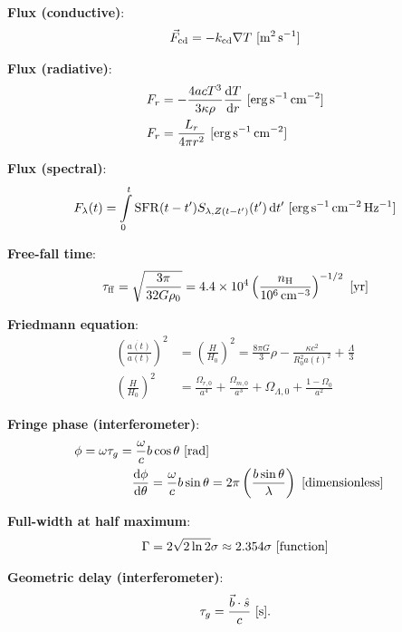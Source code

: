 \documentclass[a4paper,10pt]{article}
\begin{document}
{\noindent}\textbf{Flux (conductive)}:
\begin{align*}
    \vec{F}_{\rm cd} = -k_{\rm cd}\nabla T ~ [{\rm m^2\,s^{-1}}]
\end{align*}

{\noindent}\textbf{Flux (radiative)}:
\begin{align*}
    F_r &= -\frac{4acT^3}{3\kappa\rho}\frac{{\rm d}T}{{\rm d}r} ~ [{\rm erg\,s^{-1}\,cm^{-2}}] \\
    F_r &=  \frac{L_r}{4\pi r^2} ~ [{\rm erg\,s^{-1}\,cm^{-2}}]
\end{align*}

{\noindent}\textbf{Flux (spectral)}:
\begin{align*}
    F_\lambda(t) = \int\limits_0^t \mathrm{SFR}(t-t')S_{\lambda,Z(t-t')}(t')\,\mathrm{d}t' ~ [{\rm erg\,s^{-1}\,cm^{-2}\,Hz^{-1}}]
\end{align*}

{\noindent}\textbf{Free-fall time}:
\begin{align*}
    \tau_{\rm ff} = \sqrt{\frac{3\pi}{32G\rho_0}} = 4.4\times10^4 \left(\frac{n_{\rm H}}{10^6\,{\rm cm^{-3}}}\right)^{-1/2} ~ [{\rm yr}]
\end{align*}

{\noindent}\textbf{Friedmann equation}:
\begin{align*}
    \left(\frac{\dot{a(t)}}{a(t)}\right)^2 &=  \left(\frac{H}{H_0}\right)^2 = \frac{8\pi G}{3}\rho - \frac{\kappa c^2}{R_0^2a(t)^2} + \frac{\Lambda}{3} \\
    \left(\frac{H}{H_0}\right)^2 &= \frac{\Omega_{r,0}}{a^4} + \frac{\Omega_{m,0}}{a^3} + \Omega_{\Lambda,0} + \frac{1-\Omega_0}{a^2}
\end{align*}

{\noindent}\textbf{Fringe phase (interferometer)}:
\begin{align*}
    \phi = \omega\tau_g = \frac{\omega}{c} b\cos\theta ~ [{\rm rad}] \\
    \frac{{\rm d\phi}}{{\rm d}\theta} = \frac{\omega}{c} b\sin\theta &= 2\pi \left(\frac{b\sin\theta}{\lambda}\right) ~ [{\rm dimensionless}]
\end{align*}

{\noindent}\textbf{Full-width at half maximum}:
\begin{align*}
    \Gamma=2\sqrt{2\ln2}\sigma \approx 2.354\sigma ~ [{\rm function}]
\end{align*}

{\noindent}\textbf{Geometric delay (interferometer)}:
\begin{align*}
    \tau_g = \frac{\vec{b}\cdot\hat{s}}{c} ~ [{\rm s}].
\end{align*}
\end{document}
